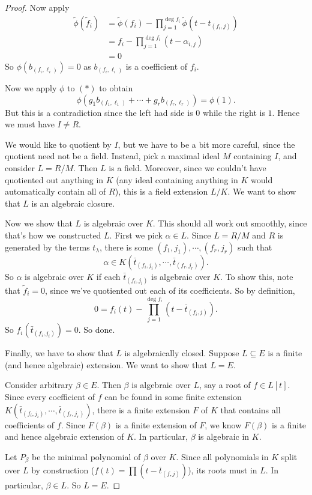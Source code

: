 \documentclass[a4paper]{article}
\begin{document}
\begin{proof}
  Now apply
  \begin{align*}
    \tilde{\phi}(\tilde{f}_i) &= \tilde{\phi}(f_i) - \prod_{j = 1}^{\deg f_i} \tilde{\phi}(t - t_{(f_i, j)})\\
    &= f_i - \prod_{j = 1}^{\deg f_i} (t - \alpha_{i, j})\\
    &= 0
  \end{align*}
  So $\phi(b_{(f_i, \ell_i)}) = 0$ as $b_{(f_i, \ell_i)}$ is a coefficient of $f_i$.

  Now we apply $\phi$ to $(*)$ to obtain
  \[
    \phi(g_1 b_{(f_1, \ell_1)} + \cdots + g_r b_{(f_r, \ell_r)}) = \phi(1).
  \]
  But this is a contradiction since the left had side is $0$ while the right is $1$. Hence we must have $I \not= R$.

  We would like to quotient by $I$, but we have to be a bit more careful, since the quotient need not be a field. Instead, pick a maximal ideal $M$ containing $I$, and consider $L = R/M$. Then $L$ is a field. Moreover, since we couldn't have quotiented out anything in $K$ (any ideal containing anything in $K$ would automatically contain all of $R$), this is a field extension $L/K$. We want to show that $L$ is an algebraic closure.

  Now we show that $L$ is algebraic over $K$. This should all work out smoothly, since that's how we constructed $L$. First we pick $\alpha\in L$. Since $L = R/M$ and $R$ is generated by the terms $t_{\lambda}$, there is some $(f_1, j_1) ,\cdots, (f_r, j_r)$ such that
  \[
    \alpha \in K(\bar{t}_{(f_i, j_i)}, \cdots, \bar{t}_{(f_r, j_r)}).
  \]
  So $\alpha$ is algebraic over $K$ if each $\bar{t}_{(f_i, j_i)}$ is algebraic over $K$. To show this, note that $\tilde{f}_i = 0$, since we've quotiented out each of its coefficients. So by definition,
  \[
    0 = f_i(t) - \prod_{j = 1}^{\deg f_i} (t - \bar{t}_{(f_i, j)}).
  \]
  So $f_i(\bar{t}_{(f_i, j_i)}) = 0$. So done.

  Finally, we have to show that $L$ is algebraically closed. Suppose $L\subseteq E$ is a finite (and hence algebraic) extension. We want to show that $L = E$.

  Consider arbitrary $\beta \in E$. Then $\beta$ is algebraic over $L$, say a root of $f\in L[t]$. Since every coefficient of $f$ can be found in some finite extension $K(\bar{t}_{(f_i, j_i)}, \cdots, \bar{t}_{(f_r, j_r)})$, there is a finite extension $F$ of $K$ that contains all coefficients of $f$. Since $F(\beta)$ is a finite extension of $F$, we know $F(\beta)$ is a finite and hence algebraic extension of $K$. In particular, $\beta$ is algebraic in $K$.

  Let $P_\beta$ be the minimal polynomial of $\beta$ over $K$. Since all polynomials in $K$ split over $L$ by construction ($f(t) = \prod (t - \bar{t}_{(f, j)})$), its roots must in $L$. In particular, $\beta \in L$. So $L = E$.
\end{proof}
\end{document}
